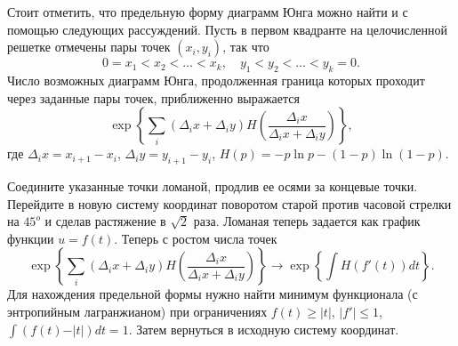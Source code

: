\begin{problem}
\begin{ordre}
Стоит отметить, что предельную форму диаграмм Юнга можно найти и с помощью 
следующих рассуждений.
Пусть в первом квадранте на целочисленной решетке отмечены пары точек $(x_i 
,y_i )$, так что
\[
0=x_1 <x_2 <\ldots <x_k ,\quad y_1 <y_2 <\ldots <y_k =0.
\]
Число возможных диаграмм Юнга, продолженная граница которых проходит через 
заданные пары точек, приближенно выражается 
\[
\exp \left\{ {\sum\limits_i {\left( {\Delta _i x+\Delta _i y} \right)H\left( 
{\frac{\Delta _i x}{\Delta _i x+\Delta _i y}} \right)} } \right\},
\]
где $\Delta _i x=x_{i+1} -x_i $, $\Delta _i y=y_{i+1} -y_i $, $H(p)=-p\ln 
p-(1-p)\ln (1-p)$.

Соедините указанные точки ломаной, продлив ее осями за концевые точки. 
Перейдите в новую систему координат поворотом старой против часовой стрелки 
на $45^o$ и сделав растяжение в $\sqrt 2 $ раза. Ломаная теперь задается как 
график функции $u=f(t)$. Теперь с ростом числа точек
\[
\exp \left\{ {\sum\limits_i {\left( {\Delta _i x+\Delta _i y} \right)H\left( 
{\frac{\Delta _i x}{\Delta _i x+\Delta _i y}} \right)} } \right\}\to \exp 
\left\{ {\int {H\left( {{f}'(t)} \right)dt} } \right\}.
\]
Для нахождения предельной формы нужно найти минимум функционала (с 
энтропийным лагранжианом) при ограничениях $f(t)\ge \vert t\vert $, $\vert 
{f}'\vert \le 1$, $\int {\left( {f(t)-\vert t\vert } \right)dt} =1$. Затем 
вернуться в исходную систему координат.
\end{ordre}
\end{problem}

